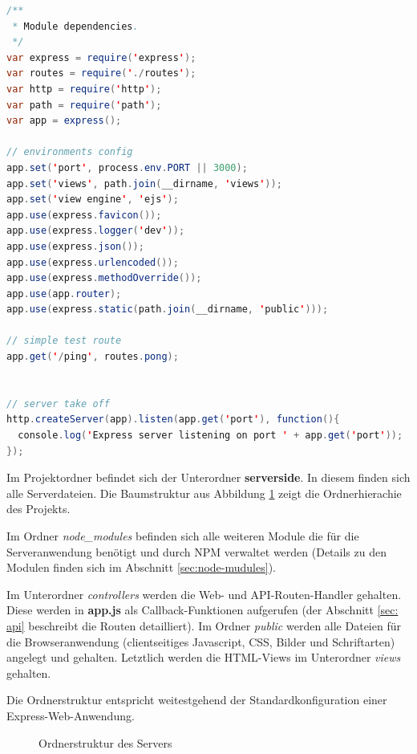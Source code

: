 \begin{lstlisting}[label=minimal_node_http_server,language=Java, caption=Minimaler Node-HTTP-Server]
/**
 * Module dependencies.
 */
var express = require('express');
var routes = require('./routes');
var http = require('http');
var path = require('path');
var app = express();

// environments config
app.set('port', process.env.PORT || 3000);
app.set('views', path.join(__dirname, 'views'));
app.set('view engine', 'ejs');
app.use(express.favicon());
app.use(express.logger('dev'));
app.use(express.json());
app.use(express.urlencoded());
app.use(express.methodOverride());
app.use(app.router);
app.use(express.static(path.join(__dirname, 'public')));

// simple test route
app.get('/ping', routes.pong);


// server take off
http.createServer(app).listen(app.get('port'), function(){
  console.log('Express server listening on port ' + app.get('port'));
});
\end{lstlisting}

Im Projektordner befindet sich der Unterordner \textbf{serverside}. In diesem finden sich alle Serverdateien. Die Baumstruktur aus Abbildung \ref{fig:server-tree} zeigt die Ordnerhierachie des Projekts.

Im Ordner \textit{node\_modules} befinden sich alle weiteren Module die für die Serveranwendung benötigt und durch NPM verwaltet werden (Details zu den Modulen finden sich im Abschnitt \ref{sec:node-mudules}). 

Im Unterordner \textit{controllers} werden die Web- und API-Routen-Handler gehalten. Diese werden in \textbf{app.js} als Callback-Funktionen aufgerufen (der Abschnitt \ref{sec: api} beschreibt die Routen detailliert). Im Ordner \textit{public} werden alle Dateien für die Browseranwendung (clientseitiges Javascript, CSS, Bilder und Schriftarten) angelegt und gehalten. Letztlich werden die HTML-Views im Unterordner \textit{views} gehalten. 

Die Ordnerstruktur entspricht weitestgehend der Standardkonfiguration einer Express-Web-Anwendung.

\begin{figure}[h!]
	\centering
			\begin{minipage}[c]{\textwidth} %
			\end{minipage}
	\caption{Ordnerstruktur des Servers}
	\label{fig:server-tree}
\end{figure}


